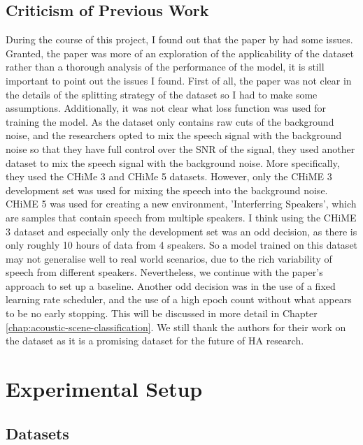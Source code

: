 \documentclass[logo,bsc,singlespacing,parskip,online]{infthesis}
\begin{document}
\section{Criticism of Previous Work}
During the course of this project, I found out that the paper by \citet{Huwel2020HearDS} had some issues.
Granted, the paper was more of an exploration of the applicability of the dataset rather than a thorough analysis of the 
performance of the model, it is still important to point out the issues I found. First of all, the paper was not clear 
in the details of the splitting strategy of the dataset so I had to make some assumptions. Additionally, it was not clear 
what loss function was used for training the model. As the dataset only contains raw cuts of the background noise, and 
the researchers opted to mix the speech signal with the background noise so that they have full control over the SNR of the signal,
they used another dataset to mix the speech signal with the background noise. More specifically, they used the CHiMe 3 \cite{barker_third_2015} 
and CHiMe 5 \cite{barker18_fifth_2018} datasets. However, only the CHiME 3 development set was used for mixing the speech into the background noise.
CHiME 5 was used for creating a new environment, 'Interferring Speakers', which are samples that contain speech from multiple speakers.
I think using the CHiME 3 dataset and especially only the development set was an odd decision, as there is only roughly 10 hours of data 
from 4 speakers. So a model trained on this dataset may not generalise well to real world scenarios, due to the rich variability of 
speech from different speakers. Nevertheless, we continue with the paper's approach to set up a baseline. Another odd decision was 
in the use of a fixed learning rate scheduler, and the use of a high epoch count without what appears to be no early stopping. This 
will be discussed in more detail in Chapter \ref{chap:acoustic-scene-classification}. We still thank the authors for their work on the dataset 
as it is a promising dataset for the future of HA research.

\chapter{Experimental Setup}
\section{Datasets}
\label{sec:datasets}
\end{document}
